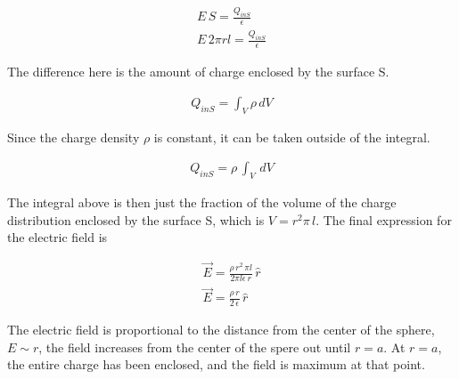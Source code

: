 \documentclass{ximera}
\begin{document}
\begin{eqnarray}
E \, S = \frac{Q_{inS}}{\epsilon} \\
 E \, 2 \pi r l = \frac{Q_{inS}}{\epsilon}
\end{eqnarray}

The difference here is the amount of charge enclosed by the surface S.  



\begin{eqnarray}
Q_{inS}=\int_V \rho \, dV
\end{eqnarray}

Since the charge density $\rho$ is constant, it can be taken outside of the integral.


\begin{eqnarray}
Q_{inS}=\rho \, \int_V \, dV
\end{eqnarray}

The integral above is then just the fraction of the volume of the charge distribution enclosed by the surface S, which is $V=r^2 \pi \, l $. The final expression for the electric field is 


\begin{eqnarray}
 \vec{E}  = \frac{\rho \, r^2 \, \pi  l }{2 \pi  l  \epsilon \, r} \, \hat{r} \\
 \vec{E}  = \frac{\rho \, r}{2  \, \epsilon } \, \hat{r}
\end{eqnarray}

The electric field is proportional to the distance from the center of the sphere, $E\sim r$, the field increases from the center of the spere out until $r=a$. At $r=a$, the entire charge has been enclosed, and the field is maximum at that point.
\end{document}
